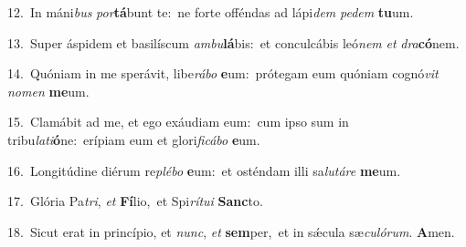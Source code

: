 {\numbfont\textcolor{\numbcolor}{12.}}~In máni\textit{bus} \textit{por}\-\textbf{tá}bunt te:~\star ne forte offéndas ad lápi\textit{dem} \textit{pe}\-\textit{dem} \textbf{tu}\-um.\par
{\numbfont\textcolor{\numbcolor}{13.}}~Super áspidem et basilíscum \textit{am}\-\textit{bu}\textbf{lá}bis:~\star et conculcábis leó\textit{nem} \textit{et} \textit{dra}\-\textbf{có}nem.\par
{\numbfont\textcolor{\numbcolor}{14.}}~Quóniam in me sperávit, libe\-\textit{rá}\-\textit{bo} \textbf{e}\-um:~\star prótegam eum quóniam cognó\textit{vit} \textit{no}\-\textit{men} \textbf{me}\-um.\par
{\numbfont\textcolor{\numbcolor}{15.}}~Clamábit ad me, et ego exáudiam eum:~\dagger cum ipso sum in tribu\-\textit{la}\-\textit{ti}\textbf{ó}ne:~\star erípiam eum et glori\-\textit{fi}\-\textit{cá}\textit{bo} \textbf{e}\-um.\par
{\numbfont\textcolor{\numbcolor}{16.}}~Longitúdine diérum re\-\textit{plé}\-\textit{bo} \textbf{e}\-um:~\star et osténdam illi sa\-\textit{lu}\-\textit{tá}\textit{re} \textbf{me}\-um.\par
{\numbfont\textcolor{\numbcolor}{17.}}~Glória Pa\-\textit{tri}\-, \textit{et} \textbf{Fí}\-lio,~\star et Spi\-\textit{rí}\-\textit{tu}\textit{i} \textbf{Sanc}\-to.\par
{\numbfont\textcolor{\numbcolor}{18.}}~Sicut erat in princípio, et \textit{nunc}\-, \textit{et} \textbf{sem}\-per,~\star et in sǽcula sæ\-\textit{cu}\-\textit{ló}\textit{rum}. \textbf{A}\-men.\par

